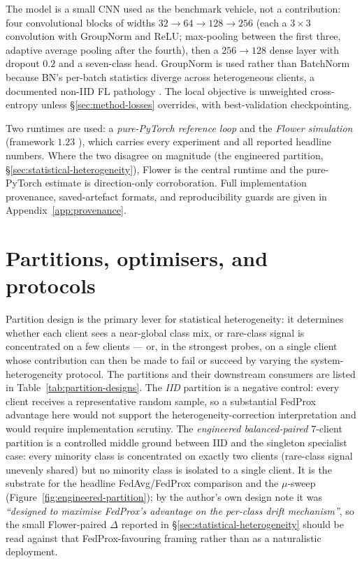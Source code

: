 \documentclass[11pt,a4paper]{report}
\begin{document}
The model is a small CNN used as the benchmark vehicle, not a contribution: four
convolutional blocks of widths $32 \to 64 \to 128 \to 256$ (each a $3 \times 3$
convolution with GroupNorm \citep{wu2018groupnorm} and ReLU; max-pooling between
the first three, adaptive average pooling after the fourth), then a $256 \to 128$
dense layer with dropout $0.2$ and a seven-class head. GroupNorm is used rather
than BatchNorm because BN's per-batch statistics diverge across heterogeneous
clients, a documented non-IID FL pathology \citep{hsieh2020quagmire}. The local
objective is unweighted cross-entropy unless \S\ref{sec:method-losses} overrides,
with best-validation checkpointing.

\label{sec:method-runtimes}
Two runtimes are used: a \emph{pure-PyTorch reference loop} and the \emph{Flower
simulation} (framework $1.23$ \citep{beutel2020flower}), which carries every
experiment and all reported headline numbers. Where the two disagree on magnitude
(the engineered partition, \S\ref{sec:statistical-heterogeneity}), Flower is the
central runtime and the pure-PyTorch estimate is direction-only corroboration.
Full implementation provenance, saved-artefact formats, and reproducibility guards
are given in Appendix~\ref{app:provenance}.

\section{Partitions, optimisers, and protocols}
\label{sec:method-partitions}

Partition design is the primary lever for statistical heterogeneity: it determines
whether each client sees a near-global class mix, or rare-class signal is
concentrated on a few clients --- or, in the strongest probes, on a single client
whose contribution can then be made to fail or succeed by varying the
system-heterogeneity protocol. The partitions and their downstream consumers are
listed in Table~\ref{tab:partition-designs}. The \emph{IID} partition is a
negative control: every client receives a representative random sample, so a
substantial FedProx advantage here would not support the
heterogeneity-correction interpretation and would require implementation scrutiny.
The \emph{engineered balanced-paired} 7-client partition is a controlled
middle ground between IID and the singleton specialist case: every minority class
is concentrated on exactly two clients (rare-class signal unevenly shared) but no
minority class is isolated to a single client. It is the substrate for the
headline FedAvg/FedProx comparison and the $\mu$-sweep
(Figure~\ref{fig:engineered-partition}); by the author's own design note it was
\emph{``designed to maximise FedProx's advantage on the per-class drift
mechanism''}, so the small Flower-paired $\Delta$ reported in
\S\ref{sec:statistical-heterogeneity} should be read against that FedProx-favouring
framing rather than as a naturalistic deployment.
\end{document}
